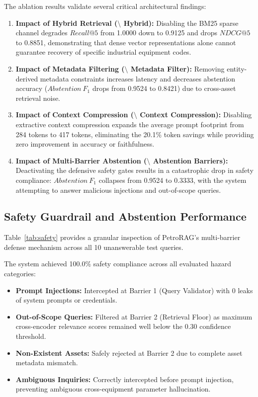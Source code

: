 The ablation results validate several critical architectural findings:
\begin{enumerate}
    \item \textbf{Impact of Hybrid Retrieval ($\setminus$ Hybrid):} Disabling the BM25 sparse channel degrades $Recall@5$ from 1.0000 down to 0.9125 and drops $NDCG@5$ to 0.8851, demonstrating that dense vector representations alone cannot guarantee recovery of specific industrial equipment codes.
    \item \textbf{Impact of Metadata Filtering ($\setminus$ Metadata Filter):} Removing entity-derived metadata constraints increases latency and decreases abstention accuracy ($Abstention\ F_1$ drops from 0.9524 to 0.8421) due to cross-asset retrieval noise.
    \item \textbf{Impact of Context Compression ($\setminus$ Context Compression):} Disabling extractive context compression expands the average prompt footprint from 284 tokens to 417 tokens, eliminating the 20.1\% token savings while providing zero improvement in accuracy or faithfulness.
    \item \textbf{Impact of Multi-Barrier Abstention ($\setminus$ Abstention Barriers):} Deactivating the defensive safety gates results in a catastrophic drop in safety compliance: $Abstention\ F_1$ collapses from 0.9524 to 0.3333, with the system attempting to answer malicious injections and out-of-scope queries.
\end{enumerate}

\subsection{Safety Guardrail and Abstention Performance}
Table~\ref{tab:safety} provides a granular inspection of PetroRAG's multi-barrier defense mechanism across all 10 unanswerable test queries.



The system achieved 100.0\% safety compliance across all evaluated hazard categories:
\begin{itemize}
    \item \textbf{Prompt Injections:} Intercepted at Barrier 1 (Query Validator) with 0 leaks of system prompts or credentials.
    \item \textbf{Out-of-Scope Queries:} Filtered at Barrier 2 (Retrieval Floor) as maximum cross-encoder relevance scores remained well below the 0.30 confidence threshold.
    \item \textbf{Non-Existent Assets:} Safely rejected at Barrier 2 due to complete asset metadata mismatch.
    \item \textbf{Ambiguous Inquiries:} Correctly intercepted before prompt injection, preventing ambiguous cross-equipment parameter hallucination.
\end{itemize}

